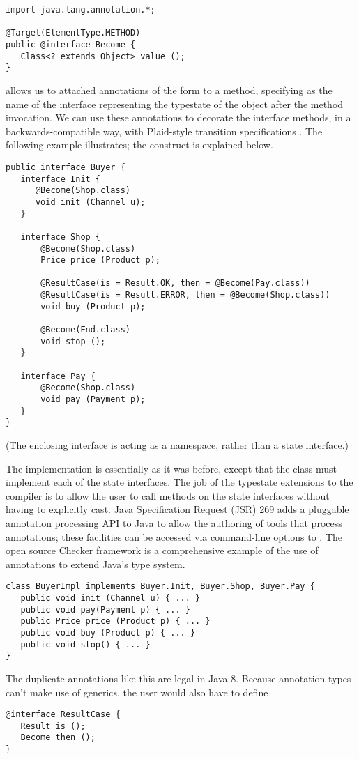 \begin{lstlisting}
import java.lang.annotation.*;

@Target(ElementType.METHOD)
public @interface Become {
   Class<? extends Object> value ();
}
\end{lstlisting}

\noindent {} allows us to attached annotations of the form
 to a method, specifying  as the
name of the interface representing the typestate of the object after
the method invocation. We can use these annotations to decorate the
interface methods, in a backwards-compatible way, with Plaid-style
transition specifications \cite{garcia14}. The following example
illustrates; the  construct is explained below.

\begin{lstlisting}
public interface Buyer {
   interface Init {
      @Become(Shop.class)
      void init (Channel u);
   }

   interface Shop {
       @Become(Shop.class)
       Price price (Product p);

       @ResultCase(is = Result.OK, then = @Become(Pay.class))
       @ResultCase(is = Result.ERROR, then = @Become(Shop.class))
       void buy (Product p);

       @Become(End.class)
       void stop ();
   }

   interface Pay {
       @Become(Shop.class)
       void pay (Payment p);
   }
}
\end{lstlisting}

\noindent (The enclosing  interface is acting as a
namespace, rather than a state interface.)

The implementation is essentially as it was before, except that the
class  must implement each of the state interfaces. The
job of the typestate extensions to the compiler is to allow the user
to call methods on the state interfaces without having to explicitly
cast. Java Specification Request (JSR) 269 \cite{jsr269} adds a
pluggable annotation processing API to Java to allow the authoring of
tools that process annotations; these facilities can be accessed via
command-line options to . The open source Checker framework
\cite{papi08,dietl11} is a comprehensive example of the use of
annotations to extend Java's type system.

\begin{lstlisting}
class BuyerImpl implements Buyer.Init, Buyer.Shop, Buyer.Pay {
   public void init (Channel u) { ... }
   public void pay(Payment p) { ... }
   public Price price (Product p) { ... }
   public void buy (Product p) { ... }
   public void stop() { ... }
}
\end{lstlisting}

\noindent The duplicate annotations like this are legal in Java 8.
Because annotation types can't make use of generics, the user would
also have to define
\begin{lstlisting}
@interface ResultCase {
   Result is ();
   Become then ();
}
\end{lstlisting}
